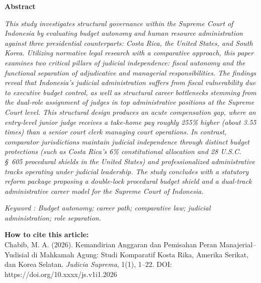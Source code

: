 \documentclass[12pt, a4paper]{article}
\begin{document}
\begin{minipage}[t]{0.73\textwidth}
    \vspace{0pt}
    \centering\textbf{Abstract}\par
    \vspace{0.5em}
    \fontsize{11}{13}\selectfont
    \textit{This study investigates structural governance within the Supreme Court of Indonesia by evaluating budget autonomy and human resource administration against three presidential counterparts: Costa Rica, the United States, and South Korea. Utilizing normative legal research with a comparative approach, this paper examines two critical pillars of judicial independence: fiscal autonomy and the functional separation of adjudicative and managerial responsibilities. The findings reveal that Indonesia's judicial administration suffers from fiscal vulnerability due to executive budget control, as well as structural career bottlenecks stemming from the dual-role assignment of judges in top administrative positions at the Supreme Court level. This structural design produces an acute compensation gap, where an entry-level junior judge receives a take-home pay roughly 255\% higher (about 3.55 times) than a senior court clerk managing court operations. In contrast, comparator jurisdictions maintain judicial independence through distinct budget protections (such as Costa Rica's 6\% constitutional allocation and 28 U.S.C. \S~605 procedural shields in the United States) and professionalized administrative tracks operating under judicial leadership. The study concludes with a statutory reform package proposing a double-lock procedural budget shield and a dual-track administrative career model for the Supreme Court of Indonesia.}\par
    \vspace{1em}
    \textit{Keyword : Budget autonomy; career path; comparative law; judicial administration; role separation.}
\end{minipage}

\vspace{1.5em}
\noindent
\colorbox{gray!15}{%
\begin{minipage}{\dimexpr\textwidth-2\fboxsep\relax}
    \centering
    \vspace{0.5em}
    \textbf{How to cite this article:}\\
    Chabib, M. A. (2026). Kemandirian Anggaran dan Pemisahan Peran Manajerial--Yudisial di Mahkamah Agung: Studi Komparatif Kosta Rika, Amerika Serikat, dan Korea Selatan. \textit{Judicia Suprema}, 1(1), 1--22. DOI: https://doi.org/10.xxxx/js.v1i1.2026
    \vspace{0.5em}
\end{minipage}}
\end{document}
